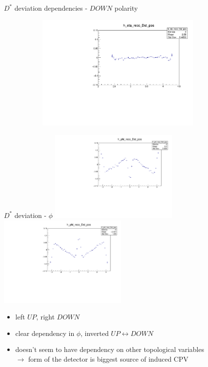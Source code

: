 \documentclass[11pt]{beamer}
\begin{document}
\begin{frame}{$D^*$ deviation dependencies - $DOWN$ polarity}
\begin{figure}
\begin{subfigure}{0.45\textwidth}
\end{subfigure}
\begin{subfigure}{0.45\textwidth}
\includegraphics[width=0.9\textwidth]{down_pdf/deviation/h_eta_reco_Dst_pos.pdf}
\end{subfigure}
\end{figure}
\end{frame}
\begin{frame}{$D^*$ deviation - $\phi$}
\centering
\includegraphics[width=0.48\textwidth]{up_pdf/deviation/h_phi_reco_Dst_pos.pdf}
\includegraphics[width=0.48\textwidth]{down_pdf/deviation/h_phi_reco_Dst_pos.pdf}
\begin{itemize}
\item left $UP$, right $DOWN$
\item clear dependency in $\phi$, inverted $UP\leftrightarrow DOWN$
\item doesn't seem to have dependency on other topological variables\\
$\rightarrow$ form of the detector is biggest source of induced CPV
\end{itemize}
\end{frame}
\end{document}

